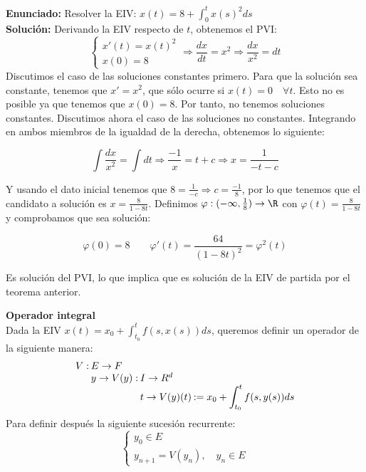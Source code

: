 \documentclass{article}
\begin{document}
\begin{ex}
  \textbf{Enunciado:} Resolver la EIV: $x(t) = 8 + \displaystyle\int_0^t x(s)^2 ds$\\

  \textbf{Solución:} Derivando la EIV respecto de $t$, obtenemos el
  PVI:
  \[
  \left\{
    \begin{array}{l}
      x'(t) = x(t)^2 \\
      x(0) = 8
    \end{array}
  \right. \Rightarrow \frac{dx}{dt} = x^2 \Rightarrow \frac{dx}{x^2} =
  dt
  \]
  Discutimos el caso de las soluciones constantes primero. Para que la
  solución sea constante, tenemos que $x' = x^2$, que sólo ocurre si
  $x(t) = 0 \quad \forall t$.  Esto no es posible ya que tenemos que
  $x(0) = 8$. Por tanto, no tenemos soluciones constantes. Discutimos
  ahora el caso de las soluciones no constantes. Integrando en ambos
  miembros de la igualdad de la derecha, obtenemos lo siguiente:

    $$ \int \frac{dx}{x^2} = \int dt \Rightarrow \frac{-1}{x} = t + c \Rightarrow
    x = \frac{1}{-t-c} $$

    Y usando el dato inicial tenemos que
    $ 8 = \frac{1}{-c} \Rightarrow c = \frac{-1}{8}$, por lo que
    tenemos que el candidato a solución es $x =
    \frac{8}{1-8t}$.
    Definimos $\varphi: (-\infty, \frac{1}{8}) \to \R$ con
    $\varphi(t) = \frac{8}{1-8t}$ y comprobamos que sea solución:

    $$ \varphi(0) = 8 \quad \quad \varphi'(t) = \frac{64}{(1-8t)^2} = \varphi^2(t) $$

    Es solución del PVI, lo que implica que es solución de la EIV de
    partida por el teorema anterior.
  \end{ex}

  \textbf{Operador integral}\\

  Dada la EIV
  $ x(t) = x_0 + \displaystyle\int_{t_0}^t f(s, x(s)) ds $, queremos
  definir un operador de la siguiente manera:
  \[\arraycolsep=1pt\def\arraystretch{1}
  \begin{array}{llll}
    V: & E \to F     &           & \\
       & y \to V(y): & I \to R^d & \\
       &             & t \to V(y)(t) & := x_0 + \displaystyle\int_{t_0}^t f(s,y(s))ds
  \end{array}
  \]
  Para definir después la siguiente sucesión recurrente:
  \[
  \left\{
    \begin{array}{l}
      y_0 \in E \\
      y_{n+1} = V(y_n), \quad y_n \in E
    \end{array}
  \right.
  \]
\end{document}
